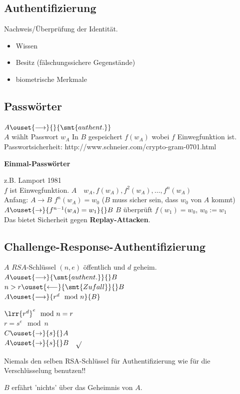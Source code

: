 \subsection{Authentifizierung}
	Nachweis/Überprüfung der Identität.
	\begin{itemize}
		\item Wissen
		\item Besitz (fälschungssichere Gegenstände)
		\item biometrische Merkmale
	\end{itemize}
	
\subsection{Passwörter}
	$A\ouset{\longrightarrow}{}{\smt{authent.}}$\\
	$A$ wählt Passwort $w_A$	
	In $B$ gespeichert $f(w_A)$ wobei $f$ Einwegfunktion ist.\\
	Passwortsicherheit: http://www.schneier.com/crypto-gram-0701.html
	
	\textbf{Einmal-Passwörter}
	
	z.B. Lamport 1981\\
	$f$ ist Einwegfunktion. $A\quad w_A, f(w_A),f^2(w_A),\dots,f^n(w_A)$\\
	Anfang: $A\rightarrow B$ $f^n(w_A)=w_0$ ($B$ muss sicher sein, dass $w_0$ von $A$ kommt)\\
	$A\ouset{\rightarrow}{f^{n-1}(w_A)=w_1}{}B$ $B$ überprüft $f(w_1)=w_0$, $w_0:=w_1$\\
	Das bietet Sicherheit gegen \textbf{Replay-Attacken}.
	
\subsection{Challenge-Response-Authentifizierung}
	$A$ $RSA$-Schlüssel $(n,e)$ öffentlich und $d$ geheim.\\
	$A\ouset{\longrightarrow}{\smt{authent.}}{}B$\\
	$n>r\ouset{\longleftarrow}{\smt{Zufall}}{}B$\\
	$A\ouset{\longrightarrow}{r^d\mod n}{B}$
	
	$\lrr{r^d}^e\mod n=r$\\
	$r=s^e\mod n$\\
	$C\ouset{\rightarrow}{s}{}A$\\
	$A\ouset{\rightarrow}{s}{}B\quad\sqrt{}$
	
	Niemals den selben RSA-Schlüssel für Authentifizierung wie für die Verschlüsselung benutzen!!
	
	$B$ erfährt 'nichts' über das Geheimnis von $A$.